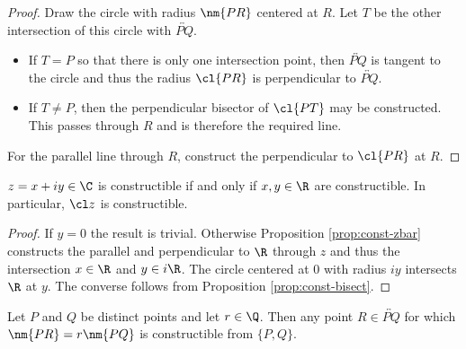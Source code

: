 \begin{proof}
Draw the circle with radius $\nm{PR}$ centered at $R$. Let $T$ be the other intersection of this circle with $\overleftrightarrow{PQ}$.
\begin{itemize}
  \item If $T=P$ so that there is only one intersection point, then $\overleftrightarrow{PQ}$ is tangent to the circle and thus the radius $\cl{PR}$ is perpendicular to $\overleftrightarrow{PQ}$.
  \item If $T\neq P$, then the perpendicular bisector of $\cl{PT}$ may be constructed. This passes through $R$ and is therefore the required line.
\end{itemize}
For the parallel line through $R$, construct the perpendicular to $\cl{PR}$ at $R$.
\end{proof}

\begin{cor}\label{prop:const-realimag}
$z=x+iy\in\C$ is constructible if and only if $x,y\in\R$ are constructible. In particular, $\cl z$ is constructible.
\end{cor}

\begin{proof}
If $y=0$ the result is trivial. Otherwise Proposition \ref{prop:const-zbar} constructs the parallel and perpendicular to $\R$ through $z$ and thus the intersection $x\in\R$ and $y\in i\R$. The circle centered at 0 with radius $iy$ intersects $\R$ at $y$. The converse follows from Proposition \ref{prop:const-bisect}. 
\end{proof}

\begin{prop}
Let $P$ and $Q$ be distinct points and let $r\in\Q$. Then any point $R\in\overleftrightarrow{PQ}$ for which  $\nm{PR}=r\nm{PQ}$ is constructible from $\{P,Q\}$.
\end{prop}

